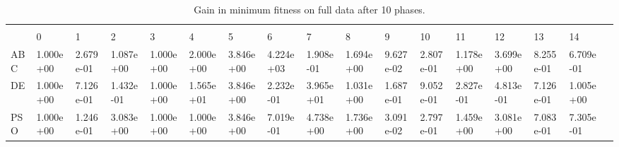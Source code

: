 \begin{landscape}
\begin{table}[]
\centering
\caption{Gain in minimum fitness on full data after 10 phases.}
\label{table:10phaseminfull}
\begin{adjustbox}{width=1.7\textwidth}
\begin{tabular}{lllllllllllllllll}
         &           &           &           &           &           &           &           &           &           &           &           &           &           &           &           &  \\
         & 0         & 1         & 2         & 3         & 4         & 5         & 6         & 7         & 8         & 9         & 10        & 11        & 12        & 13        & 14        &  \\
ABC                 & 1.000e+00 & 2.679e-01 & 1.087e+00 & 1.000e+00 & 2.000e+00 & 3.846e+00 & 4.224e+03 & 1.908e-01 & 1.694e+00 & 9.627e-02 & 2.807e-01 & 1.178e+00 & 3.699e+00 & 8.255e-01 & 6.709e-01 &  \\
DE                  & 1.000e+00 & 7.126e-01 & 1.432e-01 & 1.000e+00 & 1.565e+01 & 3.846e+00 & 2.232e-01 & 3.965e+01 & 1.031e+00 & 1.687e-01 & 9.052e-01 & 2.827e-01 & 4.813e-01 & 7.126e-01 & 1.005e+00 &  \\
PSO                 & 1.000e+00 & 1.246e-01 & 3.083e+00 & 1.000e+00 & 1.000e+00 & 3.846e+00 & 7.019e-01 & 4.738e+00 & 1.736e+00 & 3.091e-02 & 2.797e-01 & 1.459e+00 & 3.081e+00 & 7.083e-01 & 7.305e-01 &  \\

\end{tabular}
\end{adjustbox}
\end{table}


\end{landscape}
